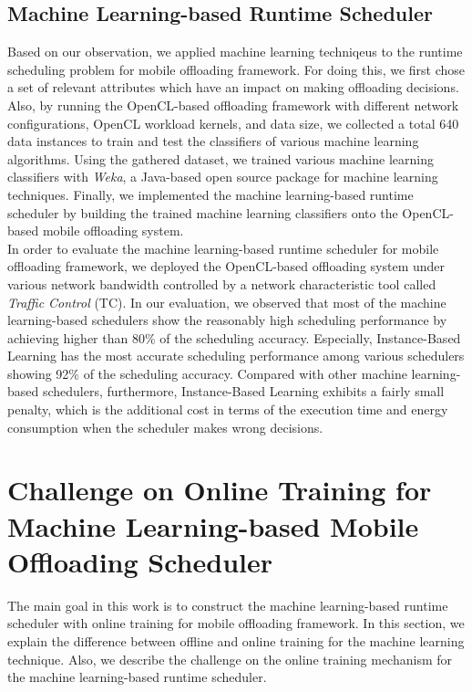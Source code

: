 \documentclass[10pt, conference, compsocconf]{IEEEtran}
\begin{document}
\subsection{Machine Learning-based Runtime Scheduler}
%
Based on our observation, we applied machine learning techniqeus to the
runtime scheduling problem for mobile offloading framework.
%
For doing this, we first chose a set of relevant attributes which have
an impact on making offloading decisions.
%
Also, by running the OpenCL-based offloading framework with different
network configurations, OpenCL workload kernels, and data size, we
collected a total 640 data instances to train and test the classifiers
of various machine learning algorithms.
%
Using the gathered dataset, we trained various machine learning
classifiers with \textit{Weka}, a Java-based open source package for
machine learning techniques.
%
Finally, we implemented the machine learning-based runtime scheduler by
building the trained machine learning classifiers onto the
OpenCL-based mobile offloading system.\\
%
\indent In order to evaluate the machine learning-based runtime
scheduler for mobile offloading framework, we deployed the OpenCL-based
offloading system under various network bandwidth controlled by a
network characteristic tool called \textit{Traffic Control} (TC).
%
In our evaluation, we observed that most of the machine learning-based
schedulers show the reasonably high scheduling performance by achieving
higher than 80\% of the scheduling accuracy.
%
Especially, Instance-Based Learning has the most accurate scheduling
performance among various schedulers showing 92\% of the scheduling
accuracy.
%
Compared with other machine learning-based schedulers, furthermore,
Instance-Based Learning exhibits a fairly small penalty, which is the
additional cost in terms of the execution time and energy consumption
when the scheduler makes wrong decisions.
%
\section{Challenge on Online Training for Machine Learning-based Mobile
Offloading Scheduler}
%
The main goal in this work is to construct the machine learning-based
runtime scheduler with online training for mobile offloading framework.
%
In this section, we explain the difference between offline and online
training for the machine learning technique.
%
Also, we describe the challenge on the online training mechanism for the
machine learning-based runtime scheduler.
%
\end{document}
